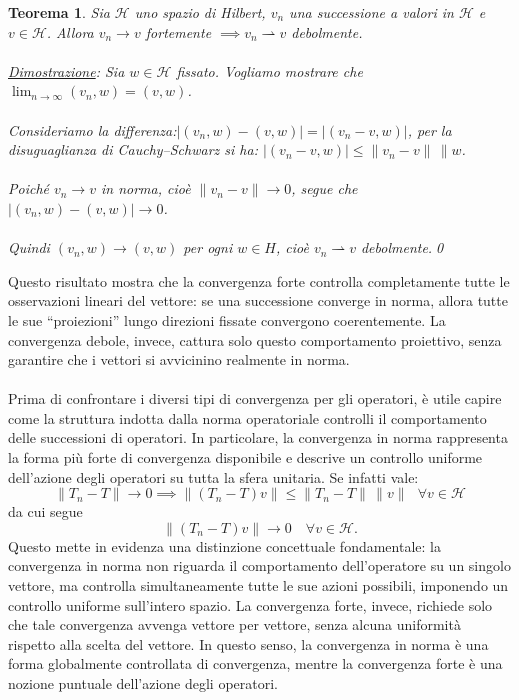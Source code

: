 \documentclass[a4paper,12pt]{report}
\newtheorem{teorema}{Teorema}[chapter]
\begin{document}
\begin{teorema}
    Sia $\mathscr{H}$ uno spazio di Hilbert, $v_n$ una successione a valori in $\mathscr{H}$ e $v\in \mathscr{H}$. Allora $v_n\to v$ fortemente $\implies v_n \rightharpoonup  v$ debolmente.
    \\
    \\\underline{Dimostrazione}: Sia $w \in \mathscr{H}$ fissato. Vogliamo mostrare che $\lim_{n\to\infty} (v_n,w) = (v,w)$.
    \\
    \\Consideriamo la differenza:$|(v_n,w)-(v,w)| = |(v_n - v, w)|$, per la disuguaglianza di Cauchy–Schwarz si ha: $|(v_n - v, w)| \le \|v_n - v\|\,\|w$.
    \\
    \\Poiché $v_n \to v$ in norma, cioè $\|v_n - v\|\to 0$, segue che $|(v_n,w)-(v,w)| \to 0$.
    \\
    \\Quindi $(v_n,w)\to (v,w)$ per ogni $w\in H$, cioè $v_n \rightharpoonup  v$ debolmente.\qed
\end{teorema}

Questo risultato mostra che la convergenza forte controlla completamente tutte le osservazioni lineari del vettore: se una successione converge in norma, allora tutte le sue “proiezioni” lungo direzioni fissate convergono coerentemente. La convergenza debole, invece, cattura solo questo comportamento proiettivo, senza garantire che i vettori si avvicinino realmente in norma. 
\\
\\Prima di confrontare i diversi tipi di convergenza per gli operatori, è utile capire come la struttura indotta dalla norma operatoriale controlli il comportamento delle successioni di operatori. In particolare, la convergenza in norma rappresenta la forma più forte di convergenza disponibile e descrive un controllo uniforme dell’azione degli operatori su tutta la sfera unitaria. Se infatti vale: 
\[
\|T_n - T\| \to 0\implies \|(T_n - T)v\| \le \|T_n - T\|\,\|v\| \ \ \  \forall v\in \mathscr{H}
\]
da cui segue
\[
\|(T_n - T)v\| \to 0 \quad \forall v \in \mathscr{H}.
\]
Questo mette in evidenza una distinzione concettuale fondamentale: la convergenza in norma non riguarda il comportamento dell’operatore su un singolo vettore, ma controlla simultaneamente tutte le sue azioni possibili, imponendo un controllo uniforme sull’intero spazio. La convergenza forte, invece, richiede solo che tale convergenza avvenga vettore per vettore, senza alcuna uniformità rispetto alla scelta del vettore. In questo senso, la convergenza in norma è una forma globalmente controllata di convergenza, mentre la convergenza forte è una nozione puntuale dell’azione degli operatori.
\end{document}
